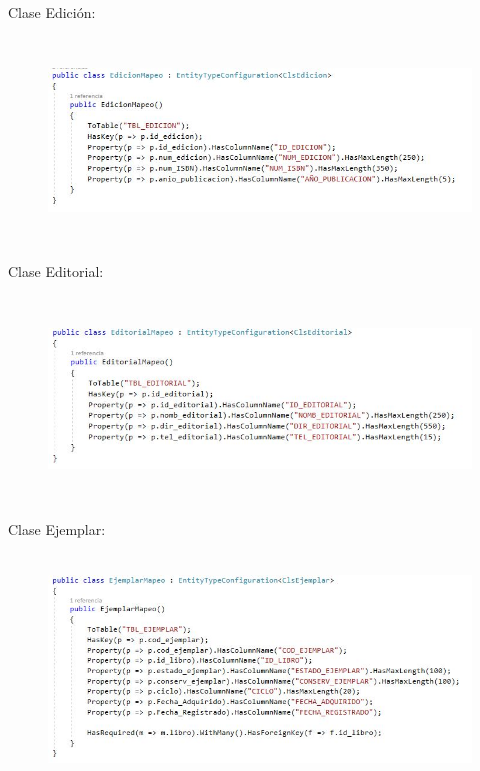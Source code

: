 \documentclass[12pt]{article}
\begin{document}
\begin{enumerate}[label*=\arabic*.]
\begin{enumerate}[label*=\arabic*.]
\newpage
Clase Edición:
\begin{figure}[H]
	\begin{Center}
		\includegraphics[width=5.91in,height=2.15in]{./media/edicionMap.jpg}
	\end{Center}
\end{figure}


Clase Editorial:
\begin{figure}[H]
	\begin{Center}
		\includegraphics[width=5.91in,height=2.15in]{./media/editorialMap.jpg}
	\end{Center}
\end{figure}


Clase Ejemplar:
\begin{figure}[H]
	\begin{Center}
		\includegraphics[width=5.91in,height=2.40in]{./media/ejemplarMap.jpg}
	\end{Center}
\end{figure}


\end{enumerate}
\end{enumerate}
\end{document}

